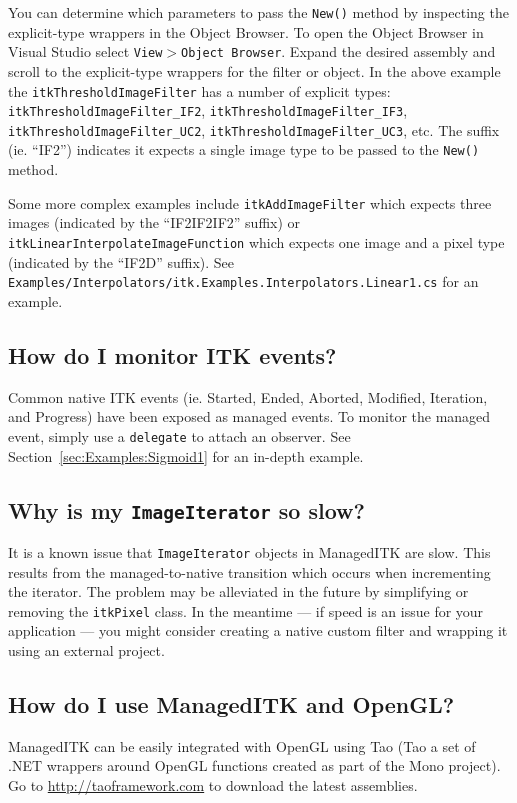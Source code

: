 \documentclass{InsightArticle}
\def\code#1{\texttt{#1}}
\begin{document}
You can determine which parameters to pass the \code{New()} method by inspecting
the explicit-type wrappers in the Object Browser.
To open the Object Browser in Visual Studio select \code{View$>$Object Browser}.
Expand the desired assembly and scroll to the explicit-type wrappers for the
filter or object.
In the above example the \code{itkThresholdImageFilter} has a number of
explicit types: 
\code{itkThresholdImageFilter\_IF2},
\code{itkThresholdImageFilter\_IF3},
\code{itkThresholdImageFilter\_UC2},
\code{itkThresholdImageFilter\_UC3},
etc.
The suffix (ie. ``IF2'') indicates it expects a single image type to be
passed to the \code{New()} method.

Some more complex examples include 
\code{itkAddImageFilter} which expects three images
(indicated by the ``IF2IF2IF2'' suffix)
or
\code{itkLinearInterpolateImageFunction} which expects one image and
a pixel type (indicated by the ``IF2D'' suffix).
See \code{Examples/Interpolators/itk.Examples.Interpolators.Linear1.cs}
for an example.

\subsection{How do I monitor ITK events?}
Common native ITK events
(ie. Started, Ended, Aborted, Modified, Iteration, and Progress)
have been exposed as managed events.
To monitor the managed event, simply use a \code{delegate} to attach an observer.
See Section~\ref{sec:Examples:Sigmoid1} for an in-depth example.

\subsection{Why is my \code{ImageIterator} so slow?}
It is a known issue that \code{ImageIterator} objects in ManagedITK are slow.
This results from the managed-to-native transition which occurs
when incrementing the iterator.
The problem may be alleviated in the future by simplifying or removing
the \code{itkPixel} class.
In the meantime --- if speed is an issue for your application ---
you might consider creating a native custom filter and wrapping it
using an external project.

\subsection{How do I use ManagedITK and OpenGL?}
ManagedITK can be easily integrated with OpenGL using Tao
(Tao a set of .NET wrappers around OpenGL functions created as part of the Mono project).
Go to \href{http://taoframework.com}{http://taoframework.com} to download the latest
assemblies.
\end{document}
